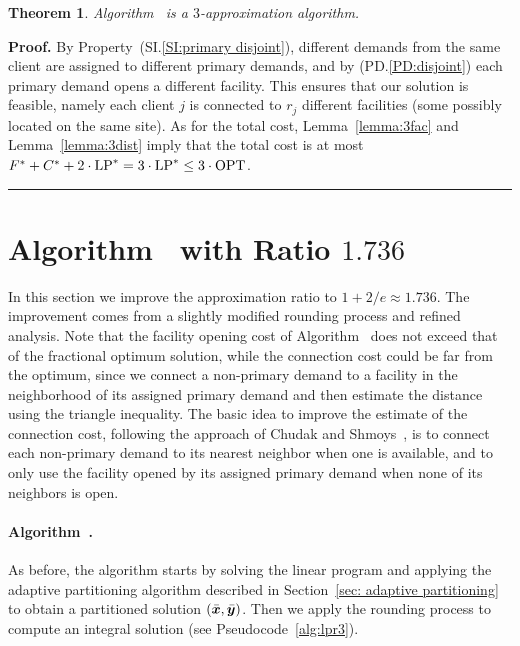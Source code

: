 \documentclass[oneside,final]{ucr}
\newtheorem{theorem}{Theorem}
\newenvironment{proof}[1][Proof]{\textbf{#1.} }{\ \rule{0.5em}{0.5em}}
\begin{document}

\begin{theorem}
Algorithm~{\EGUP} is a $3$-approximation algorithm.
\end{theorem}
\begin{proof}
  By Property~(SI.\ref{SI:primary disjoint}), different
  demands from the same client are assigned to different
  primary demands, and by (PD.\ref{PD:disjoint}) each primary
  demand opens a different facility. This ensures that our
  solution is feasible, namely each client $j$ is connected
  to $r_j$ different facilities (some possibly located on
  the same site).  As for the total cost,
  Lemma~\ref{lemma:3fac} and Lemma~\ref{lemma:3dist} imply
  that the total cost is at most
  $F^\ast+C^\ast+2\cdot\mbox{\rm LP}^\ast = 3\cdot\mbox{\rm LP}^\ast \leq
  3\cdot\mbox{\rm OPT}$.
\end{proof}


\section{Algorithm~{\ECHS} with Ratio $1.736$}
\label{sec: 1.736-approximation}

In this section we improve the approximation ratio to $1+2/e \approx
1.736$. The improvement comes from a slightly modified rounding
process and refined analysis.  Note that the facility opening cost of
Algorithm~{\EGUP} does not exceed that of the fractional optimum
solution, while the connection cost could be far from the optimum,
since we connect a non-primary demand to a facility in the neighborhood of
its assigned primary demand and then estimate the distance using the
triangle inequality. The basic idea to improve the estimate of the connection cost,
following the approach of Chudak and Shmoys~\cite{ChudakS04}, 
is to connect each non-primary demand to its
nearest neighbor when one is available, and to only use the facility opened by
its assigned primary demand when none of its neighbors is open.


\paragraph{Algorithm~{\ECHS}.}
As before,
the algorithm starts by solving the linear program and applying the
adaptive partitioning algorithm  described in 
Section~\ref{sec: adaptive partitioning} to obtain a partitioned
solution $(\bar{\boldsymbol{x}}, \bar{\boldsymbol{y}})$. Then we apply the rounding
process to compute an integral solution (see Pseudocode~\ref{alg:lpr3}).  
\end{document}
